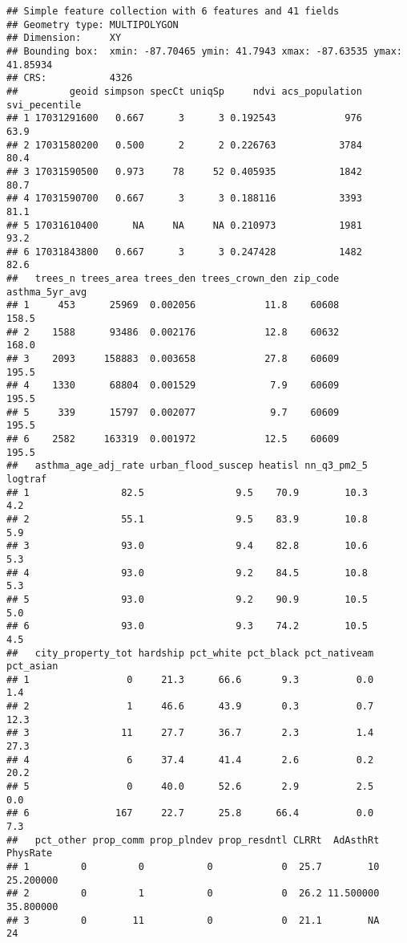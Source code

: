\documentclass[]{tufte-handout}
\begin{document}
\begin{verbatim}
## Simple feature collection with 6 features and 41 fields
## Geometry type: MULTIPOLYGON
## Dimension:     XY
## Bounding box:  xmin: -87.70465 ymin: 41.7943 xmax: -87.63535 ymax: 41.85934
## CRS:           4326
##         geoid simpson specCt uniqSp     ndvi acs_population svi_pecentile
## 1 17031291600   0.667      3      3 0.192543            976          63.9
## 2 17031580200   0.500      2      2 0.226763           3784          80.4
## 3 17031590500   0.973     78     52 0.405935           1842          80.7
## 4 17031590700   0.667      3      3 0.188116           3393          81.1
## 5 17031610400      NA     NA     NA 0.210973           1981          93.2
## 6 17031843800   0.667      3      3 0.247428           1482          82.6
##   trees_n trees_area trees_den trees_crown_den zip_code asthma_5yr_avg
## 1     453      25969  0.002056            11.8    60608          158.5
## 2    1588      93486  0.002176            12.8    60632          168.0
## 3    2093     158883  0.003658            27.8    60609          195.5
## 4    1330      68804  0.001529             7.9    60609          195.5
## 5     339      15797  0.002077             9.7    60609          195.5
## 6    2582     163319  0.001972            12.5    60609          195.5
##   asthma_age_adj_rate urban_flood_suscep heatisl nn_q3_pm2_5 logtraf
## 1                82.5                9.5    70.9        10.3     4.2
## 2                55.1                9.5    83.9        10.8     5.9
## 3                93.0                9.4    82.8        10.6     5.3
## 4                93.0                9.2    84.5        10.8     5.3
## 5                93.0                9.2    90.9        10.5     5.0
## 6                93.0                9.3    74.2        10.5     4.5
##   city_property_tot hardship pct_white pct_black pct_nativeam pct_asian
## 1                 0     21.3      66.6       9.3          0.0       1.4
## 2                 1     46.6      43.9       0.3          0.7      12.3
## 3                11     27.7      36.7       2.3          1.4      27.3
## 4                 6     37.4      41.4       2.6          0.2      20.2
## 5                 0     40.0      52.6       2.9          2.5       0.0
## 6               167     22.7      25.8      66.4          0.0       7.3
##   pct_other prop_comm prop_plndev prop_resdntl CLRRt  AdAsthRt  PhysRate
## 1         0         0           0            0  25.7        10 25.200000
## 2         0         1           0            0  26.2 11.500000 35.800000
## 3         0        11           0            0  21.1        NA        24

\end{verbatim}
\end{document}

